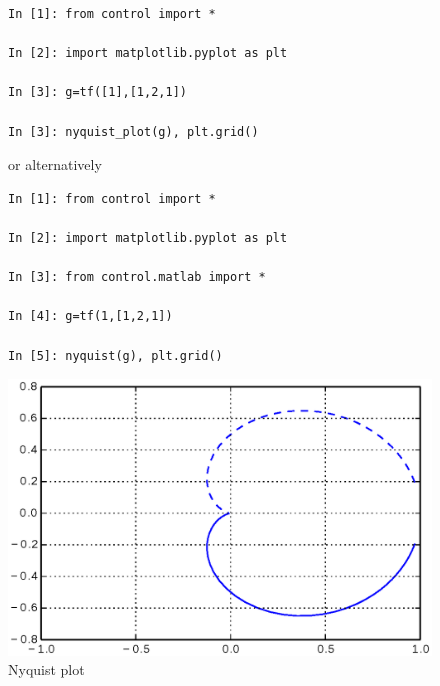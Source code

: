 \begin{figure}[htbp]
\begin{minipage}[t]{0.55\textwidth}
  \vspace{0pt}
\begin{lstlisting}[linewidth=7cm,xleftmargin=0cm]
In [1]: from control import *

In [2]: import matplotlib.pyplot as plt

In [3]: g=tf([1],[1,2,1])

In [3]: nyquist_plot(g), plt.grid()
\end{lstlisting}

or alternatively

\begin{lstlisting}[linewidth=7cm,xleftmargin=0cm]
In [1]: from control import *

In [2]: import matplotlib.pyplot as plt

In [3]: from control.matlab import *

In [4]: g=tf(1,[1,2,1])

In [5]: nyquist(g), plt.grid()
\end{lstlisting}

\end{minipage}%
\begin{minipage}[t]{0.5\textwidth}
  \vspace{0pt} \centering
  \includegraphics[width=\textwidth]{eps/nyquist.eps}
\end{minipage}
\caption{Nyquist plot}
\label{F7}
\end{figure}

